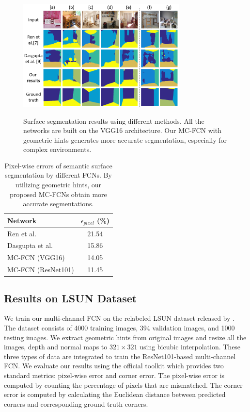 \begin{figure}[!ht]
	\centering 
	\textsc{\includegraphics[width=8.5cm]{figure/compare1.png}}
	\caption{Surface segmentation results using different methods. All the networks are built on the VGG16 architecture. Our MC-FCN with geometric hints generates more accurate segmentation, especially for complex environments.}
	\label{fig:fcn-comparison}
\end{figure}

\begin{table}
	\centering
	\begin{tabular}{l|c} 
		\hline
		Network & $\epsilon_{pixel}$ (\%)\\
		\hline
		Ren et al.~\cite{ren2016coarse} & 21.54 \\
		Dasgupta et al.~\cite{dasgupta2016delay} & 15.86 \\  \hline
		MC-FCN (VGG16)  & 14.05 \\
		MC-FCN (ResNet101) & 11.45 \\
		\hline
	\end{tabular}
	\caption{Pixel-wise errors of semantic surface segmentation by different FCNs. By utilizing geometric hints, our proposed MC-FCNs obtain more accurate segmentations. }	
	\label{table:ablation}
\end{table}

\subsection{Results on LSUN Dataset}
\label{sec:LSUN}
We train our multi-channel FCN on the relabeled LSUN dataset released by \cite{ren2016coarse}. The dataset consists of 4000 training images, 394 validation images, and 1000 testing images. 
We extract geometric hints from original images and resize all the images, depth and normal maps to $321\times321$ using bicubic interpolation. 
These three types of data are integrated to train the ResNet101-based multi-channel FCN. 
We evaluate our results using the official toolkit which provides two standard metrics: pixel-wise error and corner error. The pixel-wise error is computed by counting the percentage of pixels that are mismatched. The corner error is computed by calculating the Euclidean distance between predicted corners and corresponding ground truth corners.

